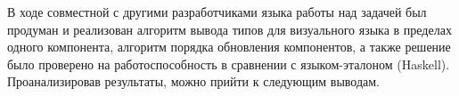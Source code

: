 \Conc
В ходе совместной с другими разработчиками языка работы над задачей был продуман и реализован алгоритм вывода типов для визуального языка в пределах одного компонента, алгоритм порядка обновления компонентов, а также решение было проверено на работоспособность в сравнении с языком-эталоном (Haskell). Проанализировав результаты, можно прийти к следующим выводам.

\nocite{*}
\printbibliography[%
    heading=bibintoc%
]





